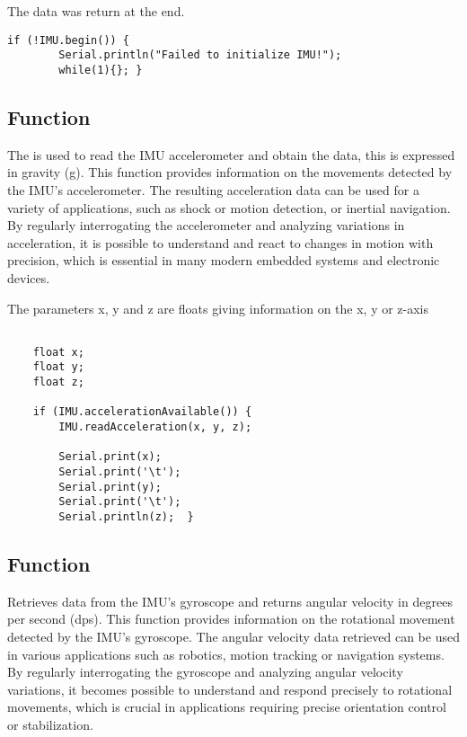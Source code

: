 The data was return at the end. 

\begin{lstlisting}[style=Arduino]
    if (!IMU.begin()) {
        Serial.println("Failed to initialize IMU!");
        while(1){}; }
\end{lstlisting}


\subsection{Function }

The  is used to read the IMU accelerometer and obtain the data, this is expressed in gravity (g). This function provides information on the movements detected by the IMU's accelerometer. The resulting acceleration data can be used for a variety of applications, such as shock or motion detection, or inertial navigation. By regularly interrogating the accelerometer and analyzing variations in acceleration, it is possible to understand and react to changes in motion with precision, which is essential in many modern embedded systems and electronic devices.

The parameters x, y and z are floats giving information on the x, y or z-axis 

\begin{lstlisting}[style=Arduino]
    
    float x; 
    float y; 
    float z;
    
    if (IMU.accelerationAvailable()) {
        IMU.readAcceleration(x, y, z);
        
        Serial.print(x);
        Serial.print('\t');
        Serial.print(y);
        Serial.print('\t');
        Serial.println(z);	}
\end{lstlisting}

\subsection{Function }

Retrieves data from the IMU's gyroscope and returns angular velocity in degrees per second (dps). This function provides information on the rotational movement detected by the IMU's gyroscope. The angular velocity data retrieved can be used in various applications such as robotics, motion tracking or navigation systems. By regularly interrogating the gyroscope and analyzing angular velocity variations, it becomes possible to understand and respond precisely to rotational movements, which is crucial in applications requiring precise orientation control or stabilization.

